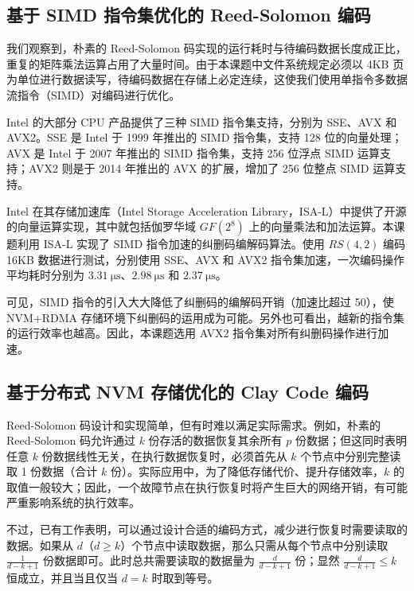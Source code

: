 \subsection{基于 SIMD 指令集优化的 Reed-Solomon 编码}
\label{subsec:ch3_rs_simd}

我们观察到，朴素的 Reed-Solomon 码实现的运行耗时与待编码数据长度成正比，重复的矩阵乘法运算占用了大量时间。由于本课题中文件系统规定必须以 4KB 页为单位进行数据读写，待编码数据在存储上必定连续，这使我们使用单指令多数据流指令（SIMD）对编码进行优化。

Intel 的大部分 CPU 产品提供了三种 SIMD 指令集支持，分别为 SSE、AVX 和 AVX2。SSE 是 Intel 于 1999 年推出的 SIMD 指令集，支持 128 位的向量处理；AVX 是 Intel 于 2007 年推出的 SIMD 指令集，支持 256 位浮点 SIMD 运算支持；AVX2 则是于 2014 年推出的 AVX 的扩展，增加了 256 位整点 SIMD 运算支持。

Intel 在其存储加速库（Intel Storage Acceleration Library，ISA-L）中提供了开源的向量运算实现，其中就包括伽罗华域 $GF(2^8)$ 上的向量乘法和加法运算。本课题利用 ISA-L 实现了 SIMD 指令加速的纠删码编解码算法。使用 $RS(4, 2)$ 编码 16KB 数据进行测试，分别使用 SSE、AVX 和 AVX2 指令集加速，一次编码操作平均耗时分别为 $\SI{3.31}{\us}$、$\SI{2.98}{\us}$ 和 $\SI{2.37}{\us}$。

可见，SIMD 指令的引入大大降低了纠删码的编解码开销（加速比超过 50），使 NVM+RDMA 存储环境下纠删码的运用成为可能。另外也可看出，越新的指令集的运行效率也越高。因此，本课题选用 AVX2 指令集对所有纠删码操作进行加速。

\subsection{基于分布式 NVM 存储优化的 Clay Code 编码}
\label{subsec:ch3_claycode}

Reed-Solomon 码设计和实现简单，但有时难以满足实际需求。例如，朴素的 Reed-Solomon 码允许通过 $k$ 份存活的数据恢复其余所有 $p$ 份数据；但这同时表明任意 $k$ 份数据线性无关，在执行数据恢复时，必须首先从 $k$ 个节点中分别完整读取 1 份数据（合计 $k$ 份）。实际应用中，为了降低存储代价、提升存储效率，$k$ 的取值一般较大；因此，一个故障节点在执行恢复时将产生巨大的网络开销，有可能严重影响系统的执行效率。

不过，已有工作\cite{dimakis2010}表明，可以通过设计合适的编码方式，减少进行恢复时需要读取的数据。如果从 $d$（$d \geq k$）个节点中读取数据，那么只需从每个节点中分别读取 $\frac{1}{d - k + 1}$ 份数据即可。此时总共需要读取的数据量为 $\frac{d}{d - k + 1}$ 份；显然 $\frac{d}{d - k + 1} \leq k$ 恒成立，并且当且仅当 $d = k$ 时取到等号。


